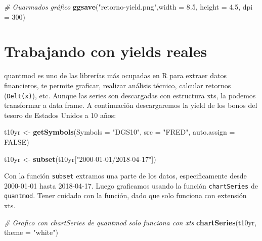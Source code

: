 \documentclass[12pt,]{book}
\newenvironment{Shaded}{\begin{snugshade}}{\end{snugshade}}
\newcommand{\KeywordTok}[1]{\textcolor[rgb]{0.13,0.29,0.53}{\textbf{#1}}}
\newcommand{\DataTypeTok}[1]{\textcolor[rgb]{0.13,0.29,0.53}{#1}}
\newcommand{\DecValTok}[1]{\textcolor[rgb]{0.00,0.00,0.81}{#1}}
\newcommand{\FloatTok}[1]{\textcolor[rgb]{0.00,0.00,0.81}{#1}}
\newcommand{\StringTok}[1]{\textcolor[rgb]{0.31,0.60,0.02}{#1}}
\newcommand{\CommentTok}[1]{\textcolor[rgb]{0.56,0.35,0.01}{\textit{#1}}}
\newcommand{\OtherTok}[1]{\textcolor[rgb]{0.56,0.35,0.01}{#1}}
\newcommand{\NormalTok}[1]{#1}
\begin{document}
\begin{Shaded}
\begin{Highlighting}[]
\CommentTok{# Guarmados gráfico}
\KeywordTok{ggsave}\NormalTok{(}\StringTok{"retorno-yield.png"}\NormalTok{,}\DataTypeTok{width =} \FloatTok{8.5}\NormalTok{, }\DataTypeTok{height =} \FloatTok{4.5}\NormalTok{, }\DataTypeTok{dpi =} \DecValTok{300}\NormalTok{)}
\end{Highlighting}
\end{Shaded}

\section{Trabajando con yields
reales}\label{trabajando-con-yields-reales}

quantmod es uno de las librerías más ocupadas en R para extraer datos
financieros, te permite graficar, realizar análisis técnico, calcular
retornos (\texttt{Delt(x)}), etc. Aunque las series son descargadas con
estructura xts, la podemos transformar a data frame. A continuación
descargaremos la yield de los bonos del tesoro de Estados Unidos a 10
años:

\begin{Shaded}
\begin{Highlighting}[]
\NormalTok{t10yr <-}\StringTok{ }\KeywordTok{getSymbols}\NormalTok{(}\DataTypeTok{Symbols =} \StringTok{"DGS10"}\NormalTok{, }\DataTypeTok{src =} \StringTok{"FRED"}\NormalTok{, }\DataTypeTok{auto.assign =} \OtherTok{FALSE}\NormalTok{)}

\NormalTok{t10yr <-}\StringTok{ }\KeywordTok{subset}\NormalTok{(t10yr[}\StringTok{"2000-01-01/2018-04-17"}\NormalTok{])}
\end{Highlighting}
\end{Shaded}

Con la función \texttt{subset} extramos una parte de los datos,
especificamente desde 2000-01-01 hasta 2018-04-17. Luego graficamos
usando la función \texttt{chartSeries} de \texttt{quantmod}. Tener
cuidado con la función, dado que solo funciona con extensión xts.

\begin{Shaded}
\begin{Highlighting}[]
\CommentTok{# Grafico con chartSeries de quantmod solo funciona con xts}
\KeywordTok{chartSeries}\NormalTok{(t10yr,  }\DataTypeTok{theme =} \StringTok{"white"}\NormalTok{)}
\end{Highlighting}
\end{Shaded}
\end{document}
